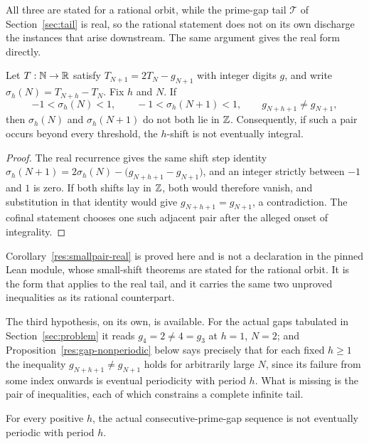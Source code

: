 \documentclass[11pt]{article}
\begin{document}
All three are stated for a rational orbit, while the prime-gap tail
$\mathcal T$ of Section~\ref{sec:tail} is real, so the rational statement does
not on its own discharge the instances that arise downstream.  The same
argument gives the real form directly.

\begin{corollary}\label{res:smallpair-real}
Let $T:\mathbb{N}\to\mathbb{R}$ satisfy $T_{N+1}=2T_N-g_{N+1}$ with integer digits $g$, and
write $\sigma_h(N)=T_{N+h}-T_N$.  Fix $h$ and $N$.  If
\[
 -1<\sigma_h(N)<1,\qquad -1<\sigma_h(N+1)<1,
 \qquad g_{N+h+1}\ne g_{N+1},
\]
then $\sigma_h(N)$ and $\sigma_h(N+1)$ do not both lie in $\mathbb{Z}$.
Consequently, if such a pair occurs beyond every threshold, the $h$-shift is
not eventually integral.
\end{corollary}

\begin{proof}
The real recurrence gives the same shift step identity
$\sigma_h(N+1)=2\sigma_h(N)-\bigl(g_{N+h+1}-g_{N+1}\bigr)$, and an integer
strictly between $-1$ and $1$ is zero.  If both shifts lay in $\mathbb{Z}$, both would
therefore vanish, and substitution in that identity would give
$g_{N+h+1}=g_{N+1}$, a contradiction.  The cofinal statement chooses one such
adjacent pair after the alleged onset of integrality.
\end{proof}

\noindent Corollary~\ref{res:smallpair-real} is proved here and is not a
declaration in the pinned Lean module, whose small-shift theorems are stated
for the rational orbit.  It is the form that applies to the real tail, and it
carries the same two unproved inequalities as its rational counterpart.

The third hypothesis, on its own, is available.  For the actual gaps tabulated
in Section~\ref{sec:problem} it reads $g_4=2\ne4=g_3$ at $h=1$, $N=2$; and
Proposition~\ref{res:gap-nonperiodic} below says precisely that for each fixed
$h\ge1$ the inequality $g_{N+h+1}\ne g_{N+1}$ holds for arbitrarily large $N$,
since its failure from some index onwards is eventual periodicity with period
$h$.  What is missing is the pair of inequalities, each of which constrains a
complete infinite tail.

\begin{proposition}\label{res:gap-nonperiodic}
For every positive $h$, the actual consecutive-prime-gap sequence is not
eventually periodic with period $h$.
\end{proposition}
\end{document}

